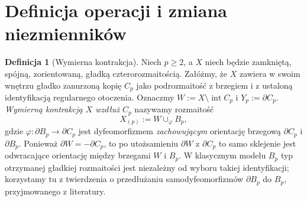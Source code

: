 \documentclass[11pt,a4paper]{report}
\numberwithin{equation}{section}
\theoremstyle{plain}
\theoremstyle{definition}
\newtheorem{definicja}[twierdzenie]{Definicja}
\theoremstyle{remark}
\begin{document}
\section{Definicja operacji i zmiana niezmienników}
\label{sec:tg-rb-definition}

\begin{definicja}[Wymierna kontrakcja]
\label{def:tg-rb-operation}
Niech $p\geq2$, a $X$ niech będzie zamkniętą,
spójną, zorientowaną, gładką czterorozmaitością.
Załóżmy, że $X$ zawiera w swoim wnętrzu
gładko zanurzoną kopię $C_p$ jako podrozmaitość
z brzegiem i z ustaloną identyfikacją
regularnego otoczenia. Oznaczmy
$W:=X\setminus\operatorname{int}C_p$ i
$Y_p:=\partial C_p$.
\emph{Wymierną kontrakcją $X$ wzdłuż $C_p$}
nazywamy rozmaitość
\[
X_{(p)}:=W\cup_{\varphi}B_p,
\]
gdzie $\varphi:\partial B_p\to\partial C_p$ jest
dyfeomorfizmem \emph{zachowującym} orientację
brzegową $\partial C_p$ i $\partial B_p$.
Ponieważ $\partial W=-\partial C_p$, to po
utożsamieniu $\partial W$ z $\partial C_p$
to samo sklejenie jest odwracające orientację
między brzegami $W$ i $B_p$.
W klasycznym modelu $B_p$ typ otrzymanej
gładkiej rozmaitości jest niezależny od wyboru
takiej identyfikacji; korzystamy tu z twierdzenia
o przedłużaniu samodyfeomorfizmów $\partial B_p$
do $B_p$, przyjmowanego z literatury.
\end{definicja}

\begin{center}
\end{center}
\end{document}
